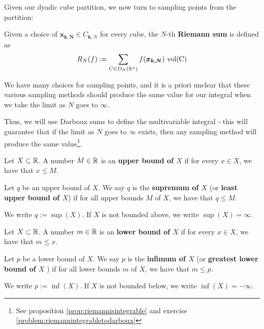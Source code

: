  


Given our dyadic cube partition, we now turn to sampling points from the partition:


\begin{definition}\label{def:riemannsum}
    Given a choice of $\bm{x_{k,N}} \in C_{\bm{k},N}$ for every cube, the $N$-th \textbf{Riemann sum} is defined as 
    $$R_N(f) := \sum_{C \in D_N(\mathbb{R}^n)} f(\bm{x_{k,N}}) \ \textnormal{vol(C)}$$
    \end{definition}

We have many choices for sampling points, and it is a priori unclear that these various sampling methods should produce the same value for our integral when we take the limit as $N$ goes to $\infty$.

Thus, we will use Darboux sums to define the multivariable integral - this will guarantee that if the limit as $N$ goes to $\infty$ exists, then any sampling method will produce the same value\footnote{See proposition \ref{prop:riemannisintegrable} and exercise \ref{problem:riemannintegrabletodarboux}}.

 \begin{definition}
    Let $X \subset \mathbb{R}$.  A number $M \in \mathbb{R}$ is an \textbf{upper bound of $X$} if for every $x \in X$, we have that $x \leq M$.  
 
    \end{definition}

\begin{definition}   
    Let $q$ be an upper bound of $X$. We say $q$ is the \textbf{supremum of $X$} (or \textbf{least upper bound of $X$}) if for all upper bounds $M$ of $X$, we have that $q \leq M$.
    
    We write $q := \sup(X)$.  If $X$ is not bounded above, we write $\sup(X) = \infty$.
    
    \end{definition}

\begin{definition}
    Let $X \subset \mathbb{R}$.  A number $m \in \mathbb{R}$ is an \textbf{lower bound of $X$} if for every $x \in X$, we have that $m \leq x$.  
 
    \end{definition}

\begin{definition}
    Let $p$ be a lower bound of $X$. We say $p$ is the \textbf{infimum of $X$} (or \textbf{greatest lower bound of $X$} ) if for all lower bounds $m$ of $X$, we have that $m \leq p$.
    
    We write $p := \inf(X)$.  If $X$ is not bounded below, we write $\inf(X) = -\infty$.
    
    \end{definition}

